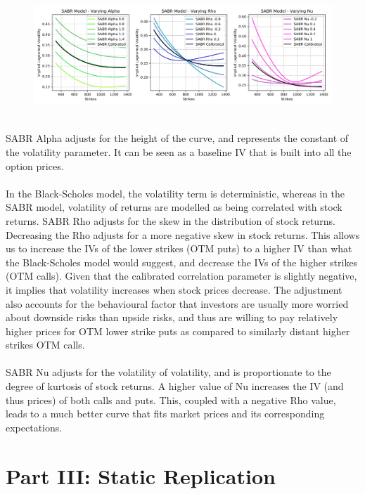 \documentclass{article}
\begin{document}
\begin{figure}[ht]
	\centering
	\includegraphics[width= \linewidth]{SABR-All.png}
\end{figure}
\noindent\\
SABR Alpha adjusts for the height of the curve, and represents the constant of the volatility parameter. It can be seen as a baseline IV that is built into all the option prices. \\
\noindent\\
In the Black-Scholes model, the volatility term is deterministic, whereas in the SABR model, volatility of returns are modelled as being correlated with stock returns. SABR Rho adjusts for the skew in the distribution of stock returns. Decreasing the Rho adjusts for a more negative skew in stock returns. This allows us to increase the IVs of the lower strikes (OTM puts) to a higher IV than what the Black-Scholes model would suggest, and decrease the IVs of the higher strikes (OTM calls). Given that the calibrated correlation parameter is slightly negative, it implies that volatility increases when stock prices decrease. The adjustment also accounts for the behavioural factor that investors are usually more worried about downside risks than upside risks, and thus are willing to pay relatively higher prices for OTM lower strike puts as compared to similarly distant higher strikes OTM calls. \\
\noindent\\
SABR Nu adjusts for the volatility of volatility, and is proportionate to the degree of kurtosis of stock returns. A higher value of Nu increases the IV (and thus prices) of both calls and puts. This, coupled with a negative Rho value, leads to a much better curve that fits market prices and its corresponding expectations. \\
	
\section*{Part III: Static Replication}	
\setcounter{section}{0}
\end{document}
